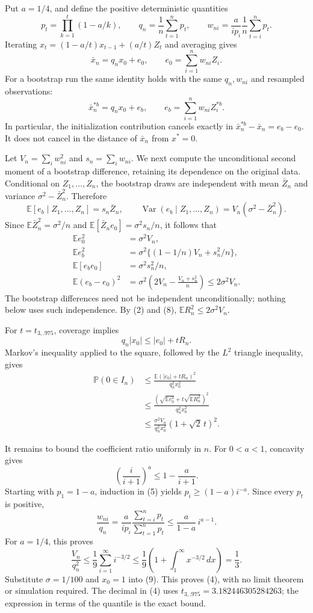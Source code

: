 \documentclass[11pt]{article}
\newcommand{\E}{\mathbb E}
\newcommand{\Pp}{\mathbb P}
\newcommand{\Var}{\operatorname{Var}}
\begin{document}
Put $a=1/4$, and define the positive deterministic quantities
\[
 p_t=\prod_{k=1}^t(1-a/k),\qquad
 q_n=\frac1n\sum_{t=1}^n p_t,\qquad
 w_{ni}=\frac{a}{i p_i}\frac1n\sum_{t=i}^n p_t.
 \tag{5}
\]
Iterating $x_t=(1-a/t)x_{t-1}+(a/t)Z_t$ and averaging gives
\[
 \bar x_n=q_nx_0+e_0,\qquad
 e_0=\sum_{i=1}^n w_{ni}Z_i.
 \tag{6}
\]
For a bootstrap run the same identity holds with the same $q_n,w_{ni}$
and resampled observations:
\[
 \bar x_n^{*b}=q_nx_0+e_b,\qquad
 e_b=\sum_{i=1}^n w_{ni}Z_i^{*b}.
 \tag{7}
\]
In particular, the initialization contribution cancels exactly in
$\bar x_n^{*b}-\bar x_n=e_b-e_0$. It does not cancel in the distance
of $\bar x_n$ from $x^*=0$.

Let $V_n=\sum_iw_{ni}^2$ and $s_n=\sum_iw_{ni}$. We next compute the
unconditional second moment of a bootstrap difference, retaining its
dependence on the original data. Conditional on $Z_1,\ldots,Z_n$,
the bootstrap draws are independent with mean $\bar Z_n$ and variance
$\sigma^2-\bar Z_n^2$. Therefore
\[
 \E[e_b\mid Z_1,\ldots,Z_n]=s_n\bar Z_n,\qquad
 \Var(e_b\mid Z_1,\ldots,Z_n)=
        V_n(\sigma^2-\bar Z_n^2).
\]
Since $\E\bar Z_n^2=\sigma^2/n$ and
$\E[\bar Z_ne_0]=\sigma^2s_n/n$, it follows that
\[
\begin{aligned}
 \E e_0^2&=\sigma^2 V_n,\\
 \E e_b^2&=\sigma^2\{(1-1/n)V_n+s_n^2/n\},\\
 \E[e_be_0]&=\sigma^2s_n^2/n,\\
 \E(e_b-e_0)^2&=
 \sigma^2\left(2V_n-\frac{V_n+s_n^2}{n}\right)
 \le2\sigma^2V_n.
\end{aligned}
 \tag{8}
\]
The bootstrap differences need not be independent unconditionally;
nothing below uses such independence. By (2) and (8),
$\E R_n^2\le2\sigma^2V_n$.

For $t=t_{3,.975}$, coverage implies
\[
 q_n|x_0|\le |e_0|+tR_n.
\]
Markov's inequality applied to the square, followed by the $L^2$
triangle inequality, gives
\[
\begin{aligned}
 \Pp(0\in I_n)
 &\le\frac{\E(|e_0|+tR_n)^2}{q_n^2x_0^2}\\
 &\le\frac{(\sqrt{\E e_0^2}
                 +t\sqrt{\E R_n^2})^2}{q_n^2x_0^2}\\
 &\le\frac{\sigma^2V_n}{q_n^2x_0^2}(1+\sqrt2\,t)^2 .
\end{aligned}
 \tag{9}
\]

It remains to bound the coefficient ratio uniformly in $n$.
For $0<a<1$, concavity gives
\[
 \left(\frac{i}{i+1}\right)^a
 \le1-\frac{a}{i+1}.
\]
Starting with $p_1=1-a$, induction in (5) yields
$p_i\ge(1-a)i^{-a}$. Since every $p_t$ is positive,
\[
 \frac{w_{ni}}{q_n}
 =\frac{a}{i p_i}
       \frac{\sum_{t=i}^n p_t}{\sum_{t=1}^n p_t}
 \le \frac{a}{1-a}\,i^{a-1}.
\]
For $a=1/4$, this proves
\[
 \frac{V_n}{q_n^2}
 \le\frac19\sum_{i=1}^\infty i^{-3/2}
 \le\frac19\left(1+\int_1^\infty x^{-3/2}\,dx\right)
 =\frac13.
 \tag{10}
\]
Substitute $\sigma=1/100$ and $x_0=1$ into (9).
This proves (4), with no limit theorem or simulation required.
The decimal in (4) uses $t_{3,.975}=3.182446305284263$; the expression
in terms of the quantile is the exact bound.
\end{document}
